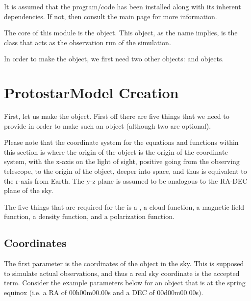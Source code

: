 \documentclass[letterpaper,10pt,english]{sphinxmanual}
\begin{document}
It is assumed that the program/code has been installed along with its inherent dependencies. If not, then consult the main page for more information.

The core of this module is the {\hyperref[\detokenize{model_observing:model_observing.ObservingRun}]{}} object. This object, as the name implies, is the class that acts as the observation run of the simulation.

In order to make the {\hyperref[\detokenize{model_observing:model_observing.ObservingRun}]{}} object, we first need two other objects: {\hyperref[\detokenize{model_observing:model_observing.ProtostarModel}]{}} and {\hyperref[\detokenize{model_observing:model_observing.Sightline}]{}} objects.


\section{ProtostarModel Creation}
\label{\detokenize{quickstart:protostarmodel-creation}}\label{\detokenize{quickstart:id1}}
First, let us make the {\hyperref[\detokenize{model_observing:model_observing.ProtostarModel}]{}} object. First off there are five things that we need to provide in order to make such an object (although two are optional).

Please note that the coordinate system for the equations and functions within this section is where the origin of the object is the origin of the coordinate system, with the x-axis on the light of sight, positive going from the observing telescope, to the origin of the object, deeper into space, and thus is equivalent to the r-axis from Earth. The y-z plane is assumed to be analogous to the RA-DEC plane of the sky.

The five things that are required for the {\hyperref[\detokenize{model_observing:model_observing.ProtostarModel}]{}} is a , a cloud function, a magnetic field function, a density function, and a polarization function.


\subsection{Coordinates}
\label{\detokenize{quickstart:coordinates}}
The first parameter is the coordinates of the object in the sky. This is supposed to simulate actual observations, and thus a real sky coordinate is the accepted term. Consider the example parameters below for an object that is at the spring equinox (i.e. a RA of 00h00m00.00s and a DEC of 00d00m00.00s).
\end{document}
